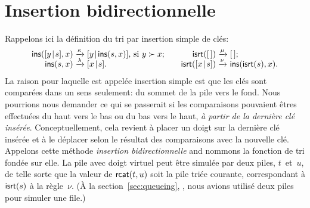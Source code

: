 \section{Insertion bidirectionnelle}
\label{sec:2-way}

Rappelons ici la définition du tri par insertion simple de clés:
\begin{equation*}
\begin{array}{@{}r@{\;}l@{\;}l@{\qquad}r@{\;}l@{\;}l@{}}
  \fun{ins}(\cons{y}{s},x)
& \xrightarrow{\smash{\kappa}}
& \cons{y}{\fun{ins}(s,x)}, \,\text{si \(y \succ x\)};
& \fun{isrt}(\el)
& \xrightarrow{\smash{\mu}}
& \el;\\
  \fun{ins}(s,x)
& \xrightarrow{\smash{\lambda}}
& \cons{x}{s}.
& \fun{isrt}(\cons{x}{s})
& \xrightarrow{\smash{\nu}}
& \fun{ins}(\fun{isrt}(s),x).
\end{array}
\end{equation*}
La raison pour laquelle  est appelée
insertion simple est que les clés sont comparées dans un sens
seulement: du sommet de la pile vers le fond. Nous pourrions nous
demander ce qui se passerait si les comparaisons pouvaient êtres
effectuées du haut vers le bas ou du bas vers le haut, \emph{à partir
  de la dernière clé insérée}. Conceptuellement, cela revient à placer
un doigt sur la dernière clé insérée et à le déplacer selon le
résultat des comparaisons avec la nouvelle clé. Appelons cette méthode
\emph{insertion bidirectionnelle} and nommons
 la fonction de tri fondée sur
elle. La pile avec doigt virtuel peut être simulée par deux piles,
\(t\)~et~\(u\), de telle sorte que la valeur de
\(\textsf{rcat}(t,u)\) soit la pile triée
courante, correspondant à \(\textsf{isrt}(s)\) à
la règle~\(\nu\). (À la section~\ref{sec:queueing},
, nous avions utilisé deux piles pour simuler
une file.)

